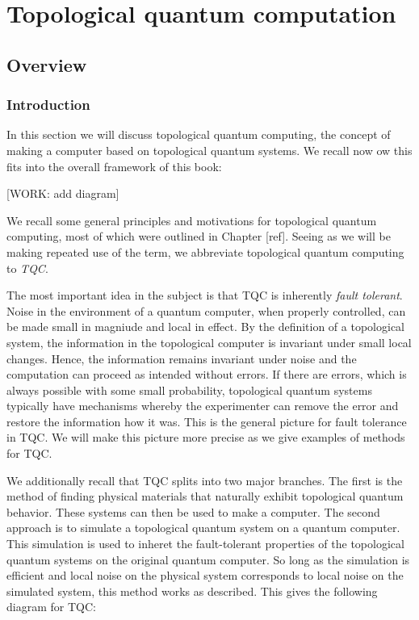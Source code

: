 \section{Topological quantum computation}
\label{Topological quantum computation}

\subsection{Overview}

\subsubsection{Introduction}

In this section we will discuss topological quantum computing, the concept of making a computer based on topological quantum systems. We recall now ow this fits into the overall framework of this book:

[WORK: add diagram]

We recall some general principles and motivations for topological quantum computing, most of which were outlined in Chapter [ref]. Seeing as we will be making repeated use of the term, we abbreviate topological quantum computing to \textit{TQC}.

The most important idea in the subject is that TQC is inherently \textit{fault tolerant}. Noise in the environment of a quantum computer, when properly controlled, can be made small in magniude and local in effect. By the definition of a topological system, the information in the topological computer is invariant under small local changes. Hence, the information remains invariant under noise and the computation can proceed as intended without errors. If there are errors, which is always possible with some small probability, topological quantum systems typically have mechanisms whereby the experimenter can remove the error and restore the information how it was. This is the general picture for fault tolerance in TQC. We will make this picture more precise as we give examples of methods for TQC.

We additionally recall that TQC splits into two major branches. The first is the method of finding physical materials that naturally exhibit topological quantum behavior. These systems can then be used to make a computer. The second approach is to simulate a topological quantum system on a quantum computer. This simulation is used to inheret the fault-tolerant properties of the topological quantum systems on the original quantum computer. So long as the simulation is efficient and local noise on the physical system corresponds to local noise on the simulated system, this method works as described. This gives the following diagram for TQC:

